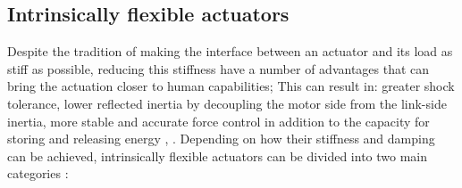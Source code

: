 \subsection{Intrinsically flexible actuators}
Despite the tradition of making the interface between an actuator and its load as stiff as possible, reducing this stiffness have a number of advantages that can bring the actuation closer to human capabilities; This can result in: greater shock tolerance, lower reflected inertia by decoupling the motor side from the link-side inertia, more stable and accurate force control in addition to the capacity for storing and releasing energy \cite{garabini2011optimality}, \cite{chen2013optimal}. Depending on how their stiffness and damping can be achieved, intrinsically flexible actuators can be divided into two main categories \cite{vanderborght2012variable}: \\

